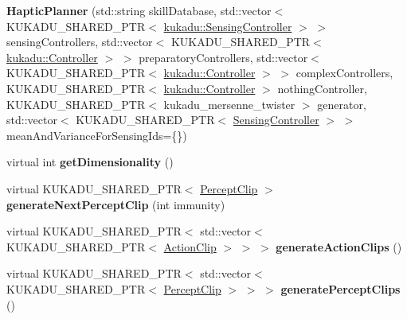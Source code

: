 \begin{DoxyCompactItemize}
\item 
{\bfseries Haptic\+Planner} (std\+::string skill\+Database, std\+::vector$<$ K\+U\+K\+A\+D\+U\+\_\+\+S\+H\+A\+R\+E\+D\+\_\+\+P\+TR$<$ \hyperlink{classkukadu_1_1SensingController}{kukadu\+::\+Sensing\+Controller} $>$ $>$ sensing\+Controllers, std\+::vector$<$ K\+U\+K\+A\+D\+U\+\_\+\+S\+H\+A\+R\+E\+D\+\_\+\+P\+TR$<$ \hyperlink{classkukadu_1_1Controller}{kukadu\+::\+Controller} $>$ $>$ preparatory\+Controllers, std\+::vector$<$ K\+U\+K\+A\+D\+U\+\_\+\+S\+H\+A\+R\+E\+D\+\_\+\+P\+TR$<$ \hyperlink{classkukadu_1_1Controller}{kukadu\+::\+Controller} $>$ $>$ complex\+Controllers, K\+U\+K\+A\+D\+U\+\_\+\+S\+H\+A\+R\+E\+D\+\_\+\+P\+TR$<$ \hyperlink{classkukadu_1_1Controller}{kukadu\+::\+Controller} $>$ nothing\+Controller, K\+U\+K\+A\+D\+U\+\_\+\+S\+H\+A\+R\+E\+D\+\_\+\+P\+TR$<$ kukadu\+\_\+mersenne\+\_\+twister $>$ generator, std\+::vector$<$ K\+U\+K\+A\+D\+U\+\_\+\+S\+H\+A\+R\+E\+D\+\_\+\+P\+TR$<$ \hyperlink{classkukadu_1_1SensingController}{Sensing\+Controller} $>$ $>$ mean\+And\+Variance\+For\+Sensing\+Ids=\{\})\hypertarget{classkukadu_1_1HapticPlanner_a9294aa4114b972120debbd923a9615af}{}\label{classkukadu_1_1HapticPlanner_a9294aa4114b972120debbd923a9615af}

\item 
virtual int {\bfseries get\+Dimensionality} ()\hypertarget{classkukadu_1_1HapticPlanner_a8e5fe565402949ff974a32bd1a895883}{}\label{classkukadu_1_1HapticPlanner_a8e5fe565402949ff974a32bd1a895883}

\item 
virtual K\+U\+K\+A\+D\+U\+\_\+\+S\+H\+A\+R\+E\+D\+\_\+\+P\+TR$<$ \hyperlink{classkukadu_1_1PerceptClip}{Percept\+Clip} $>$ {\bfseries generate\+Next\+Percept\+Clip} (int immunity)\hypertarget{classkukadu_1_1HapticPlanner_a588f0364647cff1401ce4eae9d819f47}{}\label{classkukadu_1_1HapticPlanner_a588f0364647cff1401ce4eae9d819f47}

\item 
virtual K\+U\+K\+A\+D\+U\+\_\+\+S\+H\+A\+R\+E\+D\+\_\+\+P\+TR$<$ std\+::vector$<$ K\+U\+K\+A\+D\+U\+\_\+\+S\+H\+A\+R\+E\+D\+\_\+\+P\+TR$<$ \hyperlink{classkukadu_1_1ActionClip}{Action\+Clip} $>$ $>$ $>$ {\bfseries generate\+Action\+Clips} ()\hypertarget{classkukadu_1_1HapticPlanner_aa386d3e94482e5181626c1eddebffd7b}{}\label{classkukadu_1_1HapticPlanner_aa386d3e94482e5181626c1eddebffd7b}

\item 
virtual K\+U\+K\+A\+D\+U\+\_\+\+S\+H\+A\+R\+E\+D\+\_\+\+P\+TR$<$ std\+::vector$<$ K\+U\+K\+A\+D\+U\+\_\+\+S\+H\+A\+R\+E\+D\+\_\+\+P\+TR$<$ \hyperlink{classkukadu_1_1PerceptClip}{Percept\+Clip} $>$ $>$ $>$ {\bfseries generate\+Percept\+Clips} ()\hypertarget{classkukadu_1_1HapticPlanner_a9748d448f421504336013c4aa98e243d}{}\label{classkukadu_1_1HapticPlanner_a9748d448f421504336013c4aa98e243d}


\end{DoxyCompactItemize}
